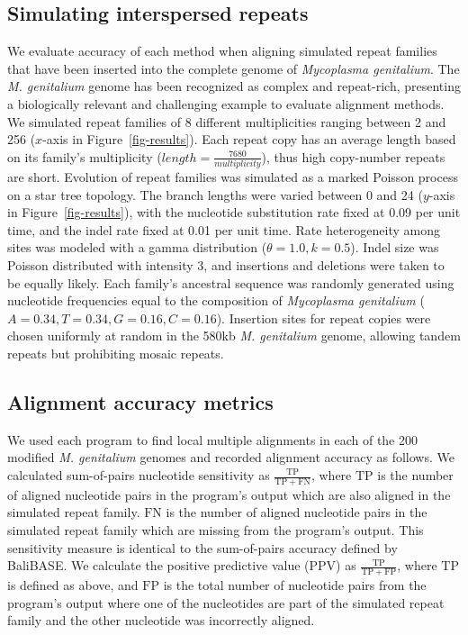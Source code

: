 \documentclass{llncs}
\begin{document}
\subsection{Simulating interspersed repeats}
We evaluate accuracy of each method when aligning simulated repeat
families that have been inserted into the complete genome of
\emph{Mycoplasma genitalium}. The \emph{M. genitalium} genome has been recognized
as complex and repeat-rich, presenting a biologically
relevant and challenging example to evaluate alignment
methods\cite{ref-mycoplasma}. We simulated repeat families of 8
different multiplicities ranging between 2 and 256 ($x$-axis in
Figure~\ref{fig-results}).  Each repeat copy has an average length
based on its family's multiplicity
($length=\frac{7680}{multiplicity}$), thus high copy-number repeats
are short.  Evolution of repeat families was simulated as a marked
Poisson process on a star tree
topology.  The branch lengths were varied between 0 and 24 ($y$-axis
in Figure~\ref{fig-results}), with the nucleotide substitution rate
fixed at 0.09 per unit time, and the indel rate fixed at 0.01 per
unit time.  Rate heterogeneity among sites was modeled with a gamma
distribution ($\theta = 1.0, k = 0.5$).  Indel size was
Poisson distributed with intensity 3, and insertions and deletions
were taken to be equally likely.  Each family's ancestral
sequence was randomly generated using nucleotide frequencies equal to
the composition of \emph{Mycoplasma genitalium}
($A=0.34,T=0.34,G=0.16,C=0.16$). Insertion sites for repeat copies
were chosen uniformly at random in the 580kb \textit{M. genitalium} genome,
allowing tandem repeats but prohibiting mosaic repeats.

\subsection{Alignment accuracy metrics}
\label{sec:metrics}
We used each program to find local multiple alignments in each of the
200 modified \emph{M. genitalium} genomes and recorded alignment
accuracy as follows. We calculated sum-of-pairs nucleotide sensitivity
as $\frac{\mathrm{TP}}{\mathrm{TP} + \mathrm{FN}}$, where
$\mathrm{TP}$ is the number of aligned nucleotide pairs in the
program's output which are also aligned in the simulated repeat
family.  $\mathrm{FN}$ is the number of aligned nucleotide pairs in
the simulated repeat family which are missing from the program's
output.  This sensitivity measure is identical to the sum-of-pairs
accuracy defined by BaliBASE\cite{ref-balibase}.  We calculate the
positive predictive value (PPV) as $\frac{\mathrm{TP}}{\mathrm{TP} +
\mathrm{FP}}$, where $\mathrm{TP}$ is defined as above, and
$\mathrm{FP}$ is the total number of nucleotide pairs from the
program's output where one of the nucleotides are part of the
simulated repeat family and the other nucleotide was incorrectly
aligned.
\end{document}
